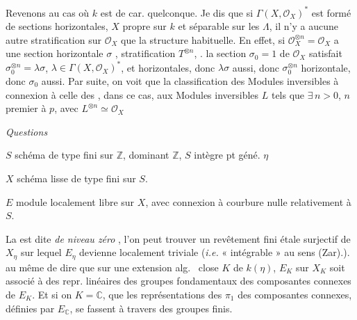 \documentclass[11pt,a4paper]{article}
\begin{document}
Revenons au cas où $k$ est de car. quelconque. Je dis \struck{\ill{}} que si
$\Gamma(X,\mathcal{O}_X)^*$ est formé de sections horizontales,
\struck{\ill{}}  $X$ propre sur $k$ et séparable sur les
$\Lambda$\ill{}, il n'y a aucune autre \struck{\ill{}} stratification sur
$\mathcal{O}_X$  que la structure habituelle. En effet,
 si $\mathcal{O}_X^{\otimes n} =
\mathcal{O}_X$ a une section horizontale $\sigma$  \struck{\ill{}},  stratification
$T^{\otimes n}$, .  la section
$\sigma_0 = 1$ de $\mathcal{O}_X$ satisfait $\sigma_0^{\otimes n} = \lambda\sigma$,
$\lambda\in\Gamma(X,\mathcal{O}_X)^*$, \add{\uncertain{\ill{}}} et
 \add{\ill{}} horizontales, donc $\lambda\sigma$ aussi, donc
$\sigma_0^{\otimes n}$ horizontale, donc $\sigma_0$ aussi. Par suite, on voit
que la classification des \struck{\ill{}} Modules inversibles à connexion
 \emph{} à celle des
\uncertain{\ill{}} \ill{}, dans ce cas, aux Modules inversibles \struck{\ill{}}
$L$ tels que $\exists\,n>0$, $n$ premier à $p$, avec $L^{\otimes n}\simeq
\mathcal{O}_X$ \ill{}

\emph{Questions}

$S$ schéma de type fini sur $\mathbb{Z}$, dominant $\mathbb{Z}$, $S$ intègre
pt géné. $\eta$

$X$ schéma lisse de type fini sur $S$.

$E$ module localement libre sur $X$, avec connexion à courbure nulle
relativement à $S$.

La   est dite
\emph{de niveau zéro}  ,  \ill{} l'on peut trouver un revêtement
fini étale surjectif de $X_\eta$ sur lequel $E_\eta$ devienne localement
triviale (\emph{i.e.} « intégrable » au sens (Zar).). 
 au même de dire que sur une
extension alg.\ 
close \struck{\ill{}} $K$ de $k(\eta)$, $E_K$ sur $X_K$ soit associé à des repr. linéaires des
groupes fondamentaux des composantes connexes de $E_K$. Et si on
 $K=\mathbb{C}$, que les représentations des
$\pi_1$  des composantes 
connexes, définies par $E_{\mathbb{C}}$, \struck{\ill{}} se fassent
à travers des groupes finis.
\end{document}
